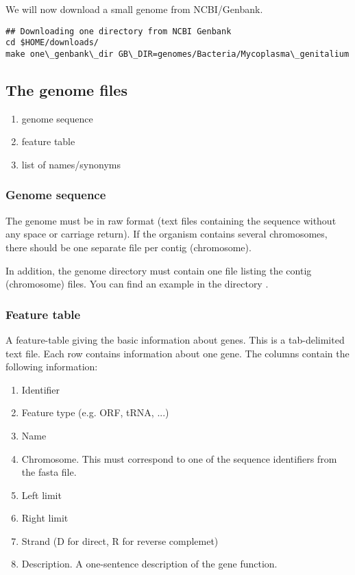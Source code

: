 We will now download a small genome from NCBI/Genbank. 

\begin{verbatim}
## Downloading one directory from NCBI Genbank
cd $HOME/downloads/
make one\_genbank\_dir GB\_DIR=genomes/Bacteria/Mycoplasma\_genitalium
\end{verbatim}



\subsection{The genome files}


\begin{enumerate}
\item genome sequence
\item feature table
\item list of names/synonyms
\end{enumerate}

\subsubsection{Genome sequence} 

The genome must be in raw format (text files containing the sequence
without any space or carriage return). If the organism contains
several chromosomes, there should be one separate file per contig
(chromosome). 

In addition, the genome directory must contain one file listing the
contig (chromosome) files. You can find an example in the directory
.


\subsubsection{Feature table}

A feature-table giving the basic information about genes. This is
a tab-delimited text file. Each row contains information about one
gene. The columns contain the following information: 
\begin{enumerate}

\item Identifier

\item Feature type (e.g. ORF, tRNA, ...)

\item Name

\item Chromosome. This must correspond to one of the sequence
identifiers from the fasta file.

\item Left limit

\item Right limit

\item Strand (D for direct, R for reverse complemet)

\item Description. A one-sentence description of the gene function.

\end{enumerate}

